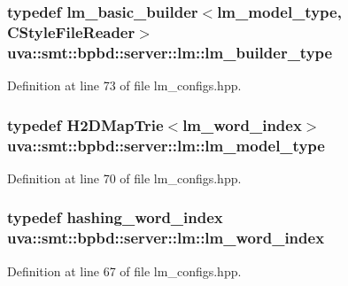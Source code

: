 \subsubsection[{lm\+\_\+builder\+\_\+type}]{\setlength{\rightskip}{0pt plus 5cm}typedef {\bf lm\+\_\+basic\+\_\+builder}$<${\bf lm\+\_\+model\+\_\+type}, {\bf C\+Style\+File\+Reader}$>$ {\bf uva\+::smt\+::bpbd\+::server\+::lm\+::lm\+\_\+builder\+\_\+type}}\label{namespaceuva_1_1smt_1_1bpbd_1_1server_1_1lm_ace2f660bee1117b5b98b58eb5c8e853a}


Definition at line 73 of file lm\+\_\+configs.\+hpp.

\hypertarget{namespaceuva_1_1smt_1_1bpbd_1_1server_1_1lm_a1d312807a76856e10bfbed1cae210b0d}{}
\subsubsection[{lm\+\_\+model\+\_\+type}]{\setlength{\rightskip}{0pt plus 5cm}typedef {\bf H2\+D\+Map\+Trie}$<${\bf lm\+\_\+word\+\_\+index}$>$ {\bf uva\+::smt\+::bpbd\+::server\+::lm\+::lm\+\_\+model\+\_\+type}}\label{namespaceuva_1_1smt_1_1bpbd_1_1server_1_1lm_a1d312807a76856e10bfbed1cae210b0d}


Definition at line 70 of file lm\+\_\+configs.\+hpp.

\hypertarget{namespaceuva_1_1smt_1_1bpbd_1_1server_1_1lm_a023e38a6fe02511f8c3c806784c2a5f2}{}
\subsubsection[{lm\+\_\+word\+\_\+index}]{\setlength{\rightskip}{0pt plus 5cm}typedef {\bf hashing\+\_\+word\+\_\+index} {\bf uva\+::smt\+::bpbd\+::server\+::lm\+::lm\+\_\+word\+\_\+index}}\label{namespaceuva_1_1smt_1_1bpbd_1_1server_1_1lm_a023e38a6fe02511f8c3c806784c2a5f2}


Definition at line 67 of file lm\+\_\+configs.\+hpp.

\hypertarget{namespaceuva_1_1smt_1_1bpbd_1_1server_1_1lm_a96890f7df15f6df7def061b4cebb16bb}{}
